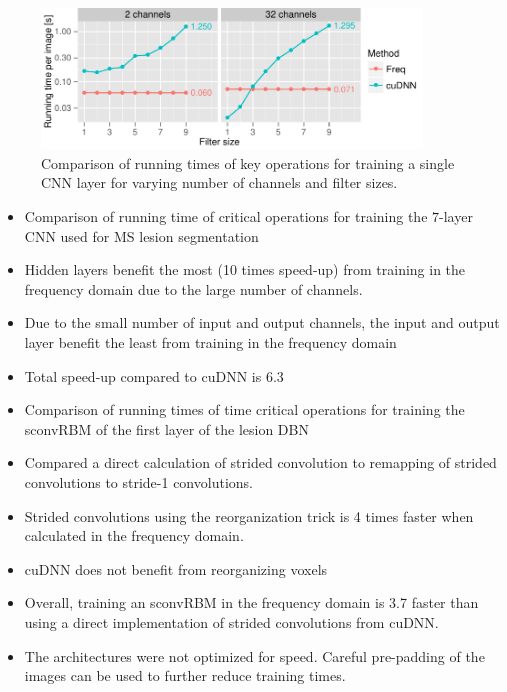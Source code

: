 \begin{figure}
\centering
\includegraphics[width=0.9\textwidth]{figures/filtersize}
\caption[Comparison of running times of key operations for training a single
CNN layer.]{Comparison of running times of key operations for training a single
CNN layer for varying number of channels and filter sizes.}
\label{fig:filtersize}
\end{figure}

\begin{itemize}
\item Comparison of running time of critical operations for training the
$7$-layer CNN used for MS lesion segmentation
\item Hidden layers benefit the most (10 times speed-up) from training in the
frequency domain due to the large number of channels.
\item Due to the small number of input and output channels, the input and output
layer benefit the least from training in the frequency domain
\item Total speed-up compared to cuDNN is 6.3
\end{itemize}

\begin{itemize}
\item Comparison of running times of time critical operations for training the
sconvRBM of the first layer of the lesion DBN
\item Compared a direct calculation of strided convolution to remapping of
strided convolutions to stride-1 convolutions.
\item Strided convolutions using the reorganization trick is 4 times faster when
calculated in the frequency domain.
\item cuDNN does not benefit from reorganizing voxels
\item Overall, training an sconvRBM in the frequency domain is 3.7 faster than
using a direct implementation of strided convolutions from cuDNN.
\item The architectures were not optimized for speed. Careful pre-padding of the
images can be used to further reduce training times.
\end{itemize}

